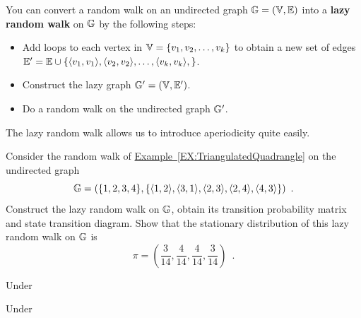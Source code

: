 \begin{model}
You can convert a random walk on an undirected graph $\mathbb{G}=(\mathbb{V},\mathbb{E})$ into a {\bf lazy random walk} on $\mathbb{G}$ by the following steps:
\begin{itemize}
\item Add loops to each vertex in $\mathbb{V} = \{v_1,v_2,\ldots,v_k\}$ to obtain a new set of edges $\mathbb{E}' = \mathbb{E} \cup \{\langle v_1,v_1 \rangle, \langle v_2,v_2 \rangle, \ldots, \langle v_k,v_k \rangle, \}$.
\item Construct the lazy graph $\mathbb{G}'=(\mathbb{V},\mathbb{E}')$.
\item Do a random walk on the undirected graph $\mathbb{G}'$.
\end{itemize} 
The lazy random walk allows us to introduce aperiodicity quite easily.
\end{model}

\begin{exercise}\label{EXR:LazyWalkTriangulatedQuadrangle}
Consider the random walk of \hyperref[EX:TriangulatedQuadrangle]{Example~\ref*{EX:TriangulatedQuadrangle}} on the undirected graph 
$$\mathbb{G}=(\{1,2,3,4\}, \{\langle 1,2 \rangle, \langle 3,1 \rangle, \langle 2,3 \rangle, \langle 2,4 \rangle, \langle 4,3\rangle\}) \enspace .$$ 
Construct the lazy random walk on $\mathbb{G}$, obtain its transition probability matrix and state transition diagram.  
Show that the stationary distribution of this lazy random walk on $\mathbb{G}$ is
\[
\pi  
= \left( \frac{3}{14}, \frac{4}{14}, \frac{4}{14}, \frac{3}{14} \right) \enspace .
\] 
\end{exercise}

\begin{model}
Under \work
\end{model}

\begin{model}
Under \work
\end{model}


